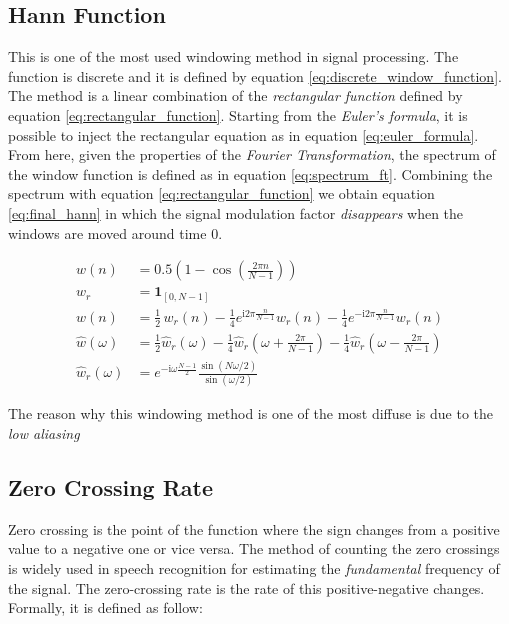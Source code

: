 \subsection{Hann Function}
\label{ssubs:hann_function}
This is one of the most used windowing method in signal processing. The function is discrete and it is defined by equation \ref{eq:discrete_window_function}. The method is a linear combination of the \textit{rectangular function} defined by equation \ref{eq:rectangular_function}. Starting from the \textit{Euler's formula}, it is possible to inject the rectangular equation as in equation \ref{eq:euler_formula}. From here, given the properties of the \textit{Fourier Transformation}, the spectrum of the window function is defined as in equation \ref{eq:spectrum_ft}. Combining the spectrum with equation \ref{eq:rectangular_function} we obtain equation \ref{eq:final_hann} in which the signal modulation factor \textit{disappears} when the windows are moved around time $0$.

\begin{subequations}
\label{eq:hann_function_equations}
\begin{align}
w(n) &= 0.5 \left(1 - \cos \left ( \frac{2 \pi n}{N-1} \right) \right) \label{eq:discrete_window_function} \\
w_r &= \mathbf{1}_{[0,N-1]} \label{eq:rectangular_function} \\
w(n) &= \frac{1}{2} \,w_r(n) -\frac{1}{4} e^{\mathrm{i}2\pi \frac{n}{N-1}} w_r(n) - \frac{1}{4}e^{-\mathrm{i}2\pi \frac{n}{N-1}} w_r(n) \label{eq:euler_formula} \\
\hat{w} (\omega) &= \frac{1}{2} \hat{w}_r (\omega) - \frac{1}{4} \hat{w}_r \left(\omega + \frac{2\pi}{N-1}\right) - \frac{1}{4} \hat{w}_r \left(\omega - \frac{2\pi}{N-1}\right) \label{eq:spectrum_ft} \\
\hat{w}_r (\omega) &= e^{-\mathrm{i} \omega \frac{N-1}{2}} \frac{\sin(N\omega/2)}{\sin(\omega/2)} \label{eq:final_hann}
\end{align}
\end{subequations}

\noindent The reason why this windowing method is one of the most diffuse is due to the \textit{low aliasing}

\subsection{Zero Crossing Rate}
\label{ssubs:Zero Crossing Rate}
Zero crossing is the point of the function where the sign changes from a positive value to a negative one or vice versa. The method of counting the zero crossings is widely used in speech recognition for estimating the \textit{fundamental} frequency of the signal. The zero-crossing rate is the rate of this positive-negative changes. Formally, it is defined as follow:

